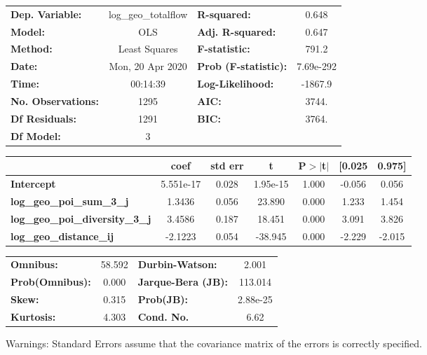 \begin{center}
\begin{tabular}{lclc}
\toprule
\textbf{Dep. Variable:}                 & log\_geo\_totalflow & \textbf{  R-squared:         } &     0.648   \\
\textbf{Model:}                         &         OLS         & \textbf{  Adj. R-squared:    } &     0.647   \\
\textbf{Method:}                        &    Least Squares    & \textbf{  F-statistic:       } &     791.2   \\
\textbf{Date:}                          &   Mon, 20 Apr 2020  & \textbf{  Prob (F-statistic):} & 7.69e-292   \\
\textbf{Time:}                          &       00:14:39      & \textbf{  Log-Likelihood:    } &   -1867.9   \\
\textbf{No. Observations:}              &          1295       & \textbf{  AIC:               } &     3744.   \\
\textbf{Df Residuals:}                  &          1291       & \textbf{  BIC:               } &     3764.   \\
\textbf{Df Model:}                      &             3       & \textbf{                     } &             \\
\bottomrule
\end{tabular}
\begin{tabular}{lcccccc}
                                        & \textbf{coef} & \textbf{std err} & \textbf{t} & \textbf{P$> |$t$|$} & \textbf{[0.025} & \textbf{0.975]}  \\
\midrule
\textbf{Intercept}                      &    5.551e-17  &        0.028     &  1.95e-15  &         1.000        &       -0.056    &        0.056     \\
\textbf{log\_geo\_poi\_sum\_3\_j}       &       1.3436  &        0.056     &    23.890  &         0.000        &        1.233    &        1.454     \\
\textbf{log\_geo\_poi\_diversity\_3\_j} &       3.4586  &        0.187     &    18.451  &         0.000        &        3.091    &        3.826     \\
\textbf{log\_geo\_distance\_ij}         &      -2.1223  &        0.054     &   -38.945  &         0.000        &       -2.229    &       -2.015     \\
\bottomrule
\end{tabular}
\begin{tabular}{lclc}
\textbf{Omnibus:}       & 58.592 & \textbf{  Durbin-Watson:     } &    2.001  \\
\textbf{Prob(Omnibus):} &  0.000 & \textbf{  Jarque-Bera (JB):  } &  113.014  \\
\textbf{Skew:}          &  0.315 & \textbf{  Prob(JB):          } & 2.88e-25  \\
\textbf{Kurtosis:}      &  4.303 & \textbf{  Cond. No.          } &     6.62  \\
\bottomrule
\end{tabular}
\end{center}

Warnings: \newline
 [1] Standard Errors assume that the covariance matrix of the errors is correctly specified.